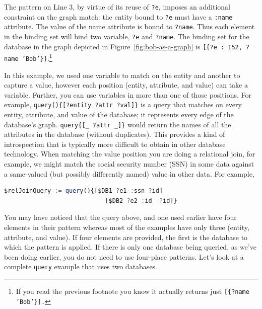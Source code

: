 \documentclass[10pt,letterpaper]{article} %
\newcommand{\stt}[1]{\texttt{#1}} %
\begin{document}
The pattern on Line 3, by virtue of its reuse of \stt{?e}, imposes an additional constraint on the graph match: the entity bound to \stt{?e} must have a \stt{:name} attribute.
The value of the name attribute is bound to \stt{?name}.
Thus each element in the binding set will bind two variable, \stt{?e} and \stt{?name}.
The binding set for the database in the graph depicted in Figure~\ref{fig:bob-as-a-graph} is \stt{[\{?e : 152, ?name 'Bob'\}]}.\footnote{If you read the previous footnote you know it actually returns just \stt{[\{?name 'Bob'\}].}}

In this example, we used one variable to match on the entity and another to capture a value, however each position (entity, attribute, and value) can take a variable.
Further, you can use variables in more than one of those positions.
For example, \stt{query()\{[?entity ?attr ?val]\}} is a query that matches on every entity, attribute, and value of the database; it represents every edge of the database's graph.
\stt{query\{[\_ ?attr \_]\}} would return the names of all the attributes in the database (without duplicates). %
This provides a kind of introspection that is typically more difficult to obtain in other database technology.
When matching the value position you are doing a relational join, for example, we might match the social security number (SSN) in
some data against a same-valued (but possibly differently named) value in other data.
For example,

\begin{lstlisting}[language=JavaScript,numbers=none,basicstyle=\ttfamily\scriptsize]
   $relJoinQuery := query(){[$DB1 ?e1 :ssn ?id]
                            [$DB2 ?e2 :id  ?id]}
\end{lstlisting} \vspace{-2em}

You may have noticed that the query above, and one used earlier have four elements in their pattern whereas most of the examples have only three (entity, attribute, and value).
If four elements are provided, the first is the database to which the pattern is applied.
If there is only one database being queried, as we've been doing earlier, you do not need to use four-place patterns.
Let's look at a complete \stt{query} example that uses two databases.
\end{document}
